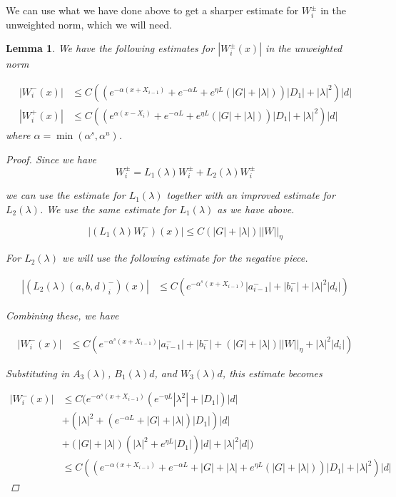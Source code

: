 \documentclass[12pt]{article}
\newtheorem{lemma}{Lemma}
\begin{document}
We can use what we have done above to get a sharper estimate for $W_i^\pm$ in the unweighted norm, which we will need.

\begin{lemma}
We have the following estimates for $|W_i^\pm(x)|$ in the unweighted norm

\begin{align*}
| W_i^-(x)| &\leq C\left(\left( e^{-\alpha(x + X_{i-1})} + e^{-\alpha L} + e^{\eta L}(|G| + |\lambda|) \right)|D_1| + |\lambda|^2 \right) |d| \\
| W_i^+(x)| &\leq C\left(\left( e^{\alpha(x - X_{i})} + e^{-\alpha L} + e^{\eta L}(|G| + |\lambda|) \right)|D_1| + |\lambda|^2 \right) |d|
\end{align*}
where $\alpha = \min(\alpha^s, \alpha^u)$.

\begin{proof}
Since we have 
\[
W_i^\pm = L_1(\lambda)W_i^\pm + L_2(\lambda)W_i^\pm 
\]

we can use the estimate for $L_1(\lambda)$ together with an improved estimate for $L_2(\lambda)$. We use the same estimate for $L_1(\lambda)$ as we have above.

\[
| (L_1(\lambda) W_i^-)(x) | \leq C\left(|G| +|\lambda|\right)||W||_\eta
\]

For $L_2(\lambda)$ we will use the following estimate for the negative piece.

\begin{align*}
| (L_2(\lambda)(a, b, d)_i^-)(x)| &\leq C \left( e^{-\alpha^s(x + X_{i-1})} |a^-_{i-1}| + |b_i^-| + |\lambda|^2 |d_i| \right)
\end{align*}

Combining these, we have

\begin{align*}
| W_i^-(x)| &\leq C \left( e^{-\alpha^s(x + X_{i-1})} |a^-_{i-1}| + |b_i^-| + \left(|G| +|\lambda|\right)||W||_\eta + |\lambda|^2 |d_i| \right)
\end{align*}

Substituting in $A_3(\lambda)$, $B_1(\lambda)d$, and $W_3(\lambda)d$, this estimate becomes

\begin{align*}
| W_i^-(x)| &\leq C ( e^{-\alpha^s(x + X_{i-1})} \left( e^{-\eta L}|\lambda^2| + |D_1| \right)|d| \\
&+ (|\lambda|^2 + (e^{-\alpha L} + |G| + |\lambda|)|D_1| )|d| \\
&+ \left(|G| +|\lambda|\right)\left( |\lambda|^2 + e^{\eta L}|D_1|\right)|d| + |\lambda|^2 |d| )\\
&\leq C\left(\left( e^{-\alpha(x + X_{i-1})} + e^{-\alpha L} + |G| + |\lambda| + e^{\eta L}(|G| + |\lambda|) \right)|D_1| + |\lambda|^2 \right) |d|
\end{align*}


\end{proof}
\end{lemma}
\end{document}
